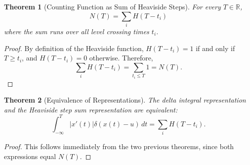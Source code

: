 \documentclass[11pt]{article}
\newtheorem{theorem}{Theorem}
\begin{document}
\begin{theorem}[Counting Function as Sum of Heaviside Steps]
For every $T \in \mathbb{R}$,
\[
N(T) = \sum_{i} H(T - t_i)
\]
where the sum runs over all level crossing times $t_i$.
\end{theorem}

\begin{proof}
By definition of the Heaviside function, $H(T - t_i) = 1$ if and only if $T \geq t_i$, and $H(T - t_i) = 0$ otherwise. Therefore,
\[
\sum_{i} H(T - t_i) = \sum_{t_i \leq T} 1 = N(T).
\]
\end{proof}

\begin{theorem}[Equivalence of Representations]
The delta integral representation and the Heaviside step sum representation are equivalent:
\[
\int_{-\infty}^T |x'(t)| \delta(x(t) - u) \, dt = \sum_{i} H(T - t_i).
\]
\end{theorem}

\begin{proof}
This follows immediately from the two previous theorems, since both expressions equal $N(T)$.
\end{proof}
\end{document}
